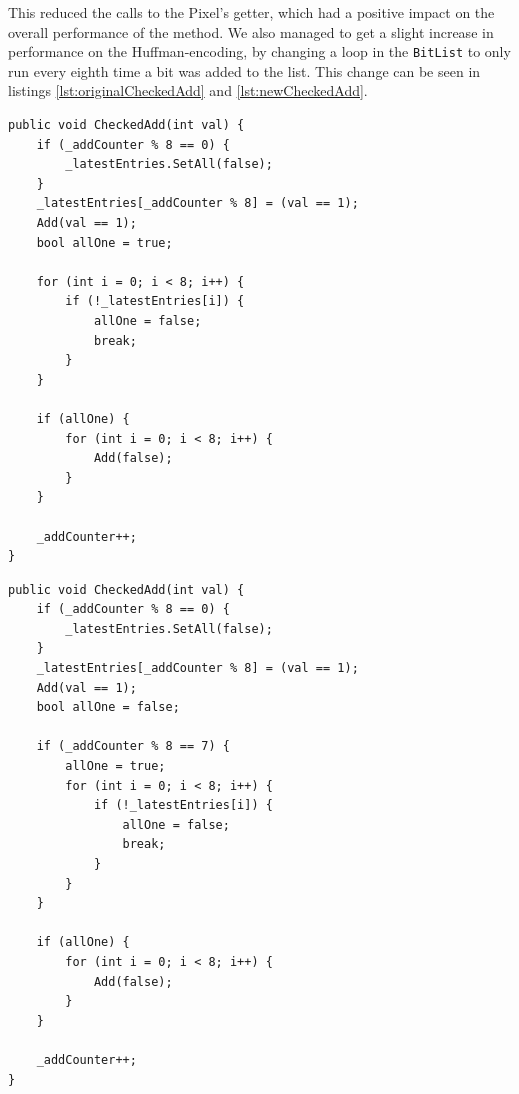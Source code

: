 This reduced the calls to the Pixel's getter, which had a positive impact on the overall performance of the method.
We also managed to get a slight increase in performance on the Huffman-encoding, by changing a loop in the \lstinline|BitList| to only run every eighth time a bit was added to the list.
This change can be seen in listings \ref{lst:originalCheckedAdd} and \ref{lst:newCheckedAdd}.

\begin{lstlisting}[firstnumber=85,label=lst:originalCheckedAdd, caption={Original \lstinline|CheckedAdd| in \lstinline|BitList|. Note the for-loop on line 93. It always runs. From unoptimised BitList.cs.}]
public void CheckedAdd(int val) {
    if (_addCounter % 8 == 0) {
        _latestEntries.SetAll(false);
    }
    _latestEntries[_addCounter % 8] = (val == 1);
    Add(val == 1);
    bool allOne = true;

    for (int i = 0; i < 8; i++) {
        if (!_latestEntries[i]) {
            allOne = false;
            break;
        }
    }

    if (allOne) {
        for (int i = 0; i < 8; i++) {
            Add(false);
        }
    }

    _addCounter++;
}
\end{lstlisting}

\begin{lstlisting}[firstnumber=26,label=lst:newCheckedAdd, caption={Improved \lstinline|CheckedAdd| in \lstinline|BitList|. The for-loop only runs an eighth of the time. From first round BitList.cs.}]
public void CheckedAdd(int val) {
    if (_addCounter % 8 == 0) {
        _latestEntries.SetAll(false);
    }
    _latestEntries[_addCounter % 8] = (val == 1);
    Add(val == 1);
    bool allOne = false;

    if (_addCounter % 8 == 7) {
        allOne = true;
        for (int i = 0; i < 8; i++) {
            if (!_latestEntries[i]) {
                allOne = false;
                break;
            }
        }
    }

    if (allOne) {
        for (int i = 0; i < 8; i++) {
            Add(false);
        }
    }

    _addCounter++;
}
\end{lstlisting}

